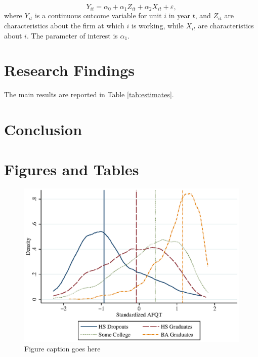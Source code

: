 \documentclass[12pt,english]{article}
\begin{document}
\begin{equation}
\label{eq:1}
Y_{it}=\alpha_{0} + \alpha_{1}Z_{it} + \alpha_{2} X_{it} + \varepsilon,
\end{equation}
where $Y_{it}$ is a continuous outcome variable for unit $i$ in year $t$, and $Z_{it}$ are characteristics about the firm at which $i$ is working, while $X_{it}$ are characteristics about $i$. The parameter of interest is $\alpha_{1}$.

\lipsum[1-6]

\section{Research Findings}\label{sec:results}
The main results are reported in Table \ref{tab:estimates}.

\lipsum[3-9]

\section{Conclusion}\label{sec:conclusion}
\lipsum[3-4]

\vfill
\pagebreak{}
\begin{spacing}{1.0}


\end{spacing}

\vfill
\pagebreak{}
\clearpage

\section*{Figures and Tables}\label{sec:figTables}
\begin{figure}[ht]
\centering
\bigskip{}
\includegraphics[width=.9\linewidth]{fig1.eps}
\caption{Figure caption goes here}
\label{fig:fig1}
\end{figure}
\end{document}
